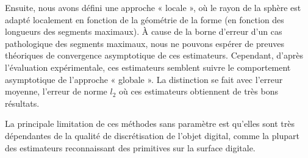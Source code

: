 Ensuite, nous avons défini une approche « locale », où le rayon de la sphère est adapté localement en
fonction de la géométrie de la forme (en fonction des longueurs des segments
maximaux). À cause de la borne d'erreur d'un cas pathologique des segments
maximaux, nous ne pouvons espérer de preuves théoriques de convergence
asymptotique de ces estimateurs. Cependant, d'après l'évaluation expérimentale,
ces estimateurs semblent suivre le comportement asymptotique de l'approche «
globale ». La distinction se fait avec l'erreur moyenne, l'erreur de norme $l_2$
où ces estimateurs obtiennent de très bons résultats.


La principale limitation de ces méthodes sans paramètre est qu'elles sont très
dépendantes de la qualité de discrétisation de l'objet digital, comme la plupart
des estimateurs reconnaissant des primitives sur la surface digitale.
